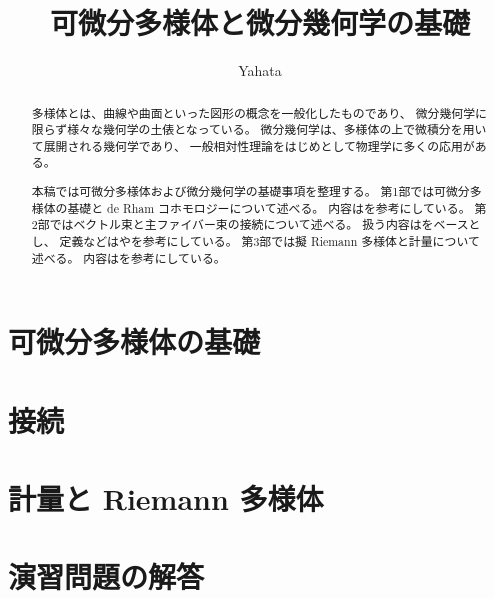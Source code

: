 \documentclass[report, notitlepage]{jlreq}
\title{可微分多様体と微分幾何学の基礎}
\author{Yahata}
\date{}
\begin{document}
\maketitle
\begin{abstract}
    多様体とは、曲線や曲面といった図形の概念を一般化したものであり、
    微分幾何学に限らず様々な幾何学の土俵となっている。
    微分幾何学は、多様体の上で微積分を用いて展開される幾何学であり、
    一般相対性理論をはじめとして物理学に多くの応用がある。

    本稿では可微分多様体および微分幾何学の基礎事項を整理する。
    第1部では可微分多様体の基礎と de Rham コホモロジーについて述べる。
    内容は\cite{Lee12}を参考にしている。
    第2部ではベクトル束と主ファイバー束の接続について述べる。
    扱う内容は\cite{小林04}をベースとし、
    定義などは\cite{Lee18}や\cite{Tu17}を参考にしている。
    第3部では擬 Riemann 多様体と計量について述べる。
    内容は\cite{Lee18}を参考にしている。
\end{abstract}

\setcounter{tocdepth}{1}
\tableofcontents
\markboth{\contentsname}{}

%
\part{可微分多様体の基礎}



\part{接続}


\part{計量と Riemann 多様体}


%
\newpage
{}
{}
\part*{演習問題の解答}


%
\newpage
{}
{}
\renewcommand{\bibname}{参考文献}
\markboth{\bibname}{}



%
\newpage
{}
{}
\printglossary[title={記号一覧}]

%
\newpage
{}
{}
\printindex
\end{document}
